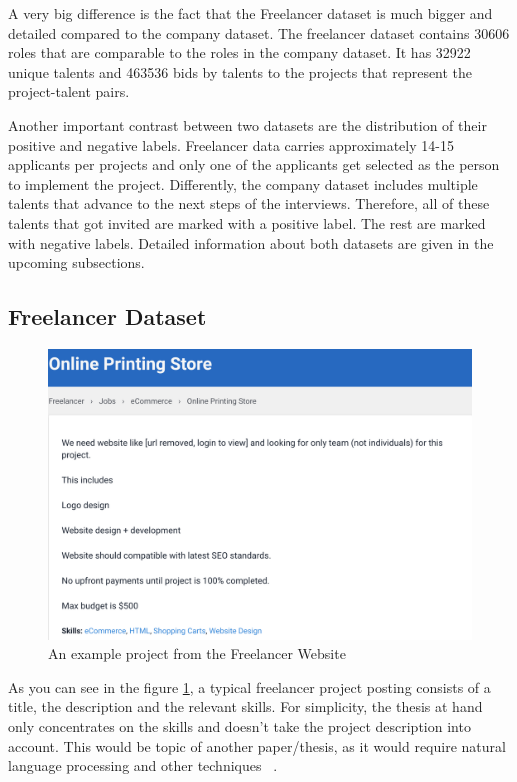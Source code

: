 A very big difference is the fact that the Freelancer dataset is much bigger and detailed compared to the company dataset. The freelancer dataset contains 30606 roles that are comparable to the roles in the company dataset. It has 32922 unique talents and 463536 bids by talents to the projects that represent the project-talent pairs.


Another important contrast between two datasets are the distribution of their positive and negative labels. Freelancer data carries approximately 14-15 applicants per projects and only one of the applicants get selected as the person to implement the project. Differently,  the company dataset includes multiple talents that advance to the next steps of the interviews. Therefore, all of these talents that got invited are marked with a positive label. The rest are marked with negative labels. Detailed information about both datasets are given in the upcoming subsections.

\subsection{Freelancer Dataset}


\begin{figure}[h]
	\centering
	\includegraphics[width=\textwidth]{figures/FreelancerExample.png}
	\caption{An example project from the Freelancer Website}
	\label{fig:freelancer-example-project}
\end{figure}


As you can see in the figure \ref{fig:freelancer-example-project}, a typical freelancer project posting consists of a title, the description and the relevant skills. For simplicity, the thesis at hand only concentrates on the skills and doesn't take the project description into account. This would be topic of another paper/thesis, as it would require natural language processing and other techniques ~\parencite{bird2009natural}.


